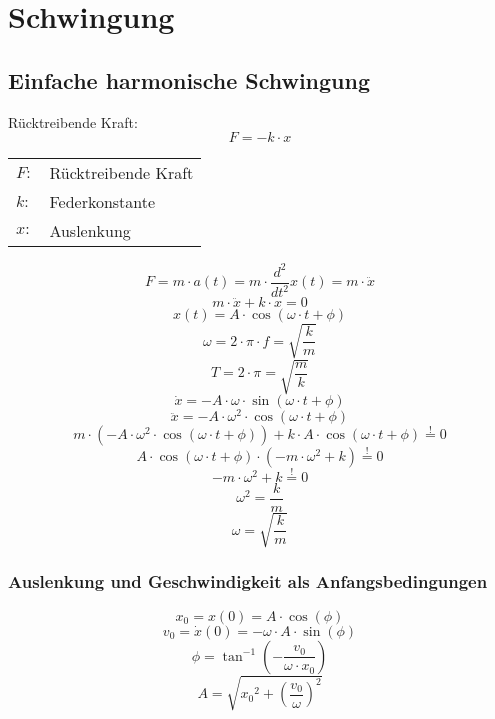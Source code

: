 



\chapter{Schwingung}
\section{Einfache harmonische Schwingung}
Rücktreibende Kraft: 
\[ \boxed{F = - k \cdot x} \]
\begin{tabular}{ll}
$F:$ & Rücktreibende Kraft \\
$k:$ & Federkonstante \\
$x:$ & Auslenkung
\end{tabular}
\[ \boxed{F = m \cdot a(t) = m \cdot \frac{d^2}{d t^2}x(t) = m \cdot \ddot{x}} \]
\[ \boxed{m \cdot \ddot{x} + k \cdot x = 0} \]
\[ \boxed{x(t) = A \cdot \cos(\omega \cdot t + \phi)} \]
\[ \boxed{\omega = 2 \cdot \pi \cdot f = \sqrt{\frac{k}{m}}} \]
\[ \boxed{T = 2 \cdot \pi = \sqrt{\frac{m}{k}}} \]
\[ \boxed{\dot{x} = - A \cdot \omega \cdot \sin(\omega \cdot t + \phi)} \]
\[ \boxed{\ddot{x} = - A \cdot \omega^2 \cdot \cos(\omega \cdot t + \phi)} \]
\[ \boxed{m \cdot (-A \cdot \omega^2 \cdot \cos(\omega \cdot t + \phi)) 
+ k \cdot A \cdot \cos(\omega \cdot t + \phi) \stackrel{!}{=} 0} \]
\[ \boxed{A \cdot \cos(\omega \cdot t + \phi) \cdot (-m \cdot  \omega^2 + k) 
\stackrel{!}{=} 0} \]
\[ \boxed{-m \cdot  \omega^2 + k \stackrel{!}{=} 0} \]
\[ \boxed{\omega^2 = \frac{k}{m}} \]
\[ \boxed{\omega = \sqrt{\frac{k}{m}}} \]

\subsection{Auslenkung und Geschwindigkeit als Anfangsbedingungen}
\[ \boxed{x_0 = x(0) = A \cdot \cos(\phi)} \]
\[ \boxed{v_0 = \dot{x}(0) = - \omega \cdot A \cdot \sin(\phi)} \]
\[ \boxed{\phi = \tan^{-1}\left(-\frac{v_0}{\omega \cdot x_0}\right)} \]
\[ \boxed{A = \sqrt{{x_0}^2 + \left(\frac{v_0}{\omega}\right)^2}} \]